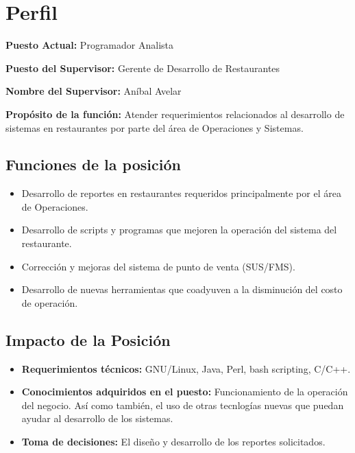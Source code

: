 
\chapter{Perfil}
\label{chap:perfil}

\textbf{Puesto Actual:} Programador Analista

\textbf{Puesto del Supervisor:} Gerente de Desarrollo de Restaurantes 

\textbf{Nombre del Supervisor:} Aníbal Avelar

\textbf{Propósito de la función:} Atender requerimientos relacionados al desarrollo de sistemas en restaurantes por parte del área de Operaciones y Sistemas.


\section{Funciones de la posición}
\label{sec:func_posicion}


\begin{itemize}
 \item Desarrollo de reportes en restaurantes requeridos principalmente por el área de Operaciones.
 \item Desarrollo de scripts y programas que mejoren la operación del sistema del restaurante.
 \item Corrección y mejoras del sistema de punto de venta (SUS/FMS).
 \item Desarrollo de nuevas herramientas que coadyuven a la disminución del costo de operación.
\end{itemize}

\section{Impacto de la Posición}
\label{sec:empacto_posicion}


\begin{itemize}
 \item \textbf{Requerimientos técnicos:} GNU/Linux, Java, Perl, bash scripting, C/C++.
 \item \textbf{Conocimientos adquiridos en el puesto:} Funcionamiento de la operación del negocio. Así como también, el uso de otras tecnlogías nuevas que puedan ayudar al desarrollo de los sistemas.
 \item \textbf{Toma de decisiones:} El diseño y desarrollo de los reportes solicitados.
\end{itemize}

